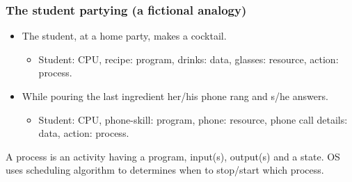   \begin{frame}
    \frametitle{The student partying (a fictional analogy)}
        \begin{itemize}
          \item The student, at a home party, makes a cocktail.
          \begin{itemize}
            \item Student: CPU, recipe: program, drinks: data, glasses: resource, action: process.
          \end{itemize}
          \item While pouring the last ingredient her/his phone rang and s/he answers.
          \begin{itemize}
            \item Student: CPU, phone-skill: program, phone: resource, phone call details: data, action: process.
          \end{itemize}
        \end{itemize}
	A process is an activity having a program, input(s), output(s) and a state. OS uses scheduling algorithm to determines when to stop/start which process.
  \end{frame}

